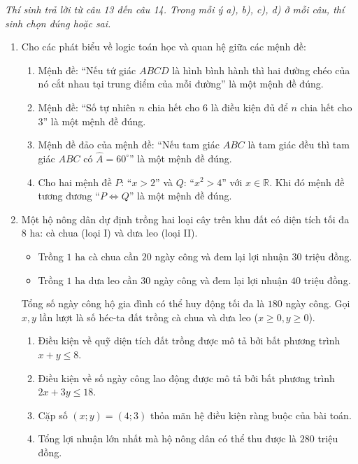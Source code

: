 \documentclass[12pt,a4paper]{article}
\newcommand{\parttitle}[1]{\par\vspace{2pt}{\large\bfseries\color{ink}#1}\par\vspace{1pt}}
\begin{document}
\parttitle{PHẦN II. Trắc nghiệm đúng/sai}
\textit{Thí sinh trả lời từ câu 13 đến câu 14. Trong mỗi ý a), b), c), d) ở mỗi câu, thí sinh chọn đúng hoặc sai.}
\begin{enumerate}[resume]
\item Cho các phát biểu về logic toán học và quan hệ giữa các mệnh đề:
\begin{enumerate}
    \item Mệnh đề: ``Nếu tứ giác $ABCD$ là hình bình hành thì hai đường chéo của nó cắt nhau tại trung điểm của mỗi đường'' là một mệnh đề đúng.
    \item Mệnh đề: ``Số tự nhiên $n$ chia hết cho $6$ là điều kiện đủ để $n$ chia hết cho $3$'' là một mệnh đề đúng.
    \item Mệnh đề đảo của mệnh đề: ``Nếu tam giác $ABC$ là tam giác đều thì tam giác $ABC$ có $\widehat{A} = 60^\circ$'' là một mệnh đề đúng.
    \item Cho hai mệnh đề $P$: ``$x > 2$'' và $Q$: ``$x^2 > 4$'' với $x \in \mathbb{R}$. Khi đó mệnh đề tương đương ``$P \Leftrightarrow Q$'' là một mệnh đề đúng.
\end{enumerate}

\item Một hộ nông dân dự định trồng hai loại cây trên khu đất có diện tích tối đa $8\text{ ha}$: cà chua (loại I) và dưa leo (loại II).
\begin{itemize}[leftmargin=0.5cm]
    \item Trồng $1\text{ ha}$ cà chua cần $20$ ngày công và đem lại lợi nhuận $30$ triệu đồng.
    \item Trồng $1\text{ ha}$ dưa leo cần $30$ ngày công và đem lại lợi nhuận $40$ triệu đồng.
\end{itemize}
Tổng số ngày công hộ gia đình có thể huy động tối đa là $180$ ngày công. Gọi $x, y$ lần lượt là số héc-ta đất trồng cà chua và dưa leo ($x \ge 0, y \ge 0$).
\begin{enumerate}
    \item Điều kiện về quỹ diện tích đất trồng được mô tả bởi bất phương trình $x + y \le 8$.
    \item Điều kiện về số ngày công lao động được mô tả bởi bất phương trình $2x + 3y \le 18$.
    \item Cặp số $(x; y) = (4; 3)$ thỏa mãn hệ điều kiện ràng buộc của bài toán.
    \item Tổng lợi nhuận lớn nhất mà hộ nông dân có thể thu được là $280$ triệu đồng.
\end{enumerate}
\end{enumerate}
\end{document}
